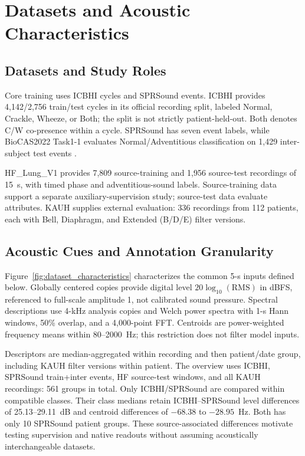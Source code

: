 \section{Datasets and Acoustic Characteristics}
\label{sec:data_alignment}

\subsection{Datasets and Study Roles}
Core training uses ICBHI cycles and SPRSound events. ICBHI provides
4,142/2,756 train/test cycles in its official recording split, labeled
Normal, Crackle, Wheeze, or Both\cite{rocha2019icbhi}; the split is not
strictly patient-held-out. Both denotes C/W co-presence within a cycle.
SPRSound has seven event labels, while BioCAS2022 Task1-1 evaluates
Normal/Adventitious classification on 1,429 inter-subject test events
\cite{zhang2022sprsound}.

HF\_Lung\_V1 provides 7,809 source-training and 1,956 source-test recordings
of 15~s, with timed phase and adventitious-sound labels\cite{hsu2021hflung}.
Source-training data support a separate auxiliary-supervision study;
source-test data evaluate attributes. KAUH supplies external evaluation:
336 recordings from 112 patients, each with Bell, Diaphragm, and Extended
(B/D/E) filter versions\cite{fraiwan2021kauh}.

\subsection{Acoustic Cues and Annotation Granularity}
\label{sec:acoustic_characteristics}
Figure~\ref{fig:dataset_characteristics} characterizes the common 5-s
inputs defined below. Globally centered copies provide digital level
$20\log_{10}(\mathrm{RMS})$ in dBFS, referenced to full-scale amplitude 1,
not calibrated sound pressure. Spectral descriptions use 4-kHz analysis
copies and Welch power spectra\cite{welch1967spectra} with 1-s Hann windows,
50\% overlap, and a 4,000-point FFT. Centroids are power-weighted frequency
means within 80--2000~Hz; this restriction does not filter model inputs.

Descriptors are median-aggregated within recording and then patient/date
group, including KAUH filter versions within patient. The overview uses
ICBHI, SPRSound train+inter events, HF source-test windows, and all KAUH
recordings: 561 groups in total. Only ICBHI/SPRSound are compared within
compatible classes. Their class medians retain ICBHI--SPRSound level
differences of 25.13--29.11~dB and centroid differences of
$-68.38$ to $-28.95$~Hz. Both has only 10 SPRSound patient groups.
These source-associated differences motivate testing supervision and
native readouts without assuming acoustically interchangeable datasets.

